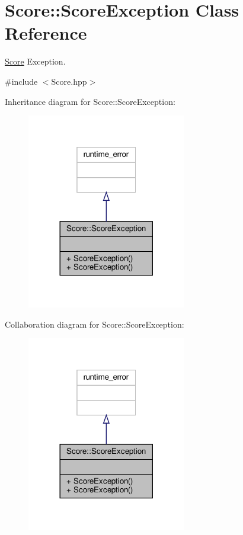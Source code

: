 \hypertarget{class_score_1_1_score_exception}{}\section{Score\+:\+:Score\+Exception Class Reference}
\label{class_score_1_1_score_exception}


\hyperlink{class_score}{Score} Exception.  




{\ttfamily \#include $<$Score.\+hpp$>$}



Inheritance diagram for Score\+:\+:Score\+Exception\+:
\nopagebreak
\begin{figure}[H]
\begin{center}
\leavevmode
\includegraphics[width=197pt]{class_score_1_1_score_exception__inherit__graph}
\end{center}
\end{figure}


Collaboration diagram for Score\+:\+:Score\+Exception\+:
\nopagebreak
\begin{figure}[H]
\begin{center}
\leavevmode
\includegraphics[width=197pt]{class_score_1_1_score_exception__coll__graph}
\end{center}
\end{figure}

